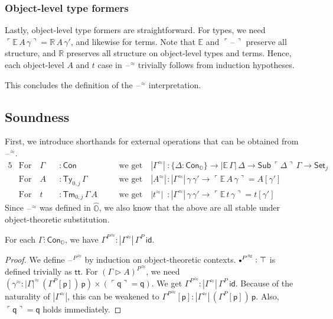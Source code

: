 \documentclass[acmsmall,review]{acmart}
\newcommand{\msf}[1]{\mathsf{#1}}
\newcommand{\mbb}[1]{\mathbb{#1}}
\newcommand{\ext}{\triangleright}
\newcommand{\mbbo}{\mbb{O}}
\newcommand{\Con}{\msf{Con}}
\newcommand{\Sub}{\msf{Sub}}
\newcommand{\Ty}{\msf{Ty}}
\newcommand{\Tm}{\msf{Tm}}
\newcommand{\Cono}{\msf{Con}_{\mbbo}}
\newcommand{\p}{\mathsf{p}}
\newcommand{\q}{\mathsf{q}}
\renewcommand{\tt}{\msf{tt}}
\newcommand{\emptycon}{\scaleobj{.75}\bullet}
\newcommand{\id}{\msf{id}}
\newcommand{\Set}{\mathsf{Set}}
\newcommand{\blank}{{\mathord{\hspace{1pt}\text{--}\hspace{1pt}}}}
\newcommand{\emb}[1]{\ulcorner#1\urcorner}
\newcommand{\hato}{\bm\hat{\mbbo}}
\newcommand{\ev}{\mbb{E}}
\newcommand{\re}{\mbb{R}}
\theoremstyle{remark}
\newcommand{\rel}{^{\approx}}
\begin{document}
\subsubsection{Object-level type formers}
Lastly, object-level type formers are straightforward. For types, we need
$\emb{\ev\,A\,\gamma} = \re\,A\,\gamma'$, and likewise for terms. Note that
$\ev$ and $\emb{\blank}$ preserve all structure, and $\re$ preserves all
structure on object-level types and terms. Hence, each object-level $A$ and $t$
case in $\blank\rel$ trivially follows from induction hypotheses.

This concludes the definition of the $\blank\rel$ interpretation.

\subsection{Soundness}

\begin{definition} First, we introduce shorthands for
external operations that can be obtained from $\blank\rel$.
\begin{alignat*}{5}
  & \text{For}\hspace{1em} \Gamma &&: \Con \hspace{1em}&&\text{we get}\hspace{1em}
         |\Gamma\rel| &&: \{\Delta : \Cono\} \to |\ev\,\Gamma|\,\Delta \to \Sub\,\emb{\Delta}\,\Gamma \to \Set_j\\
  & \text{For}\hspace{1em} A &&: \Ty_{0,j}\,\Gamma \hspace{1em}&&\text{we get}\hspace{1em} |A\rel| &&: |\Gamma\rel|\,\gamma\,\gamma' \to \emb{\ev\,A\,\gamma} = A[\gamma']\\
  & \text{For}\hspace{1em} t &&: \Tm_{0,j}\,\Gamma\,A \hspace{1em}&&\text{we get}\hspace{1em}|t\rel| &&: |\Gamma\rel|\,\gamma\,\gamma' \to \emb{\ev\,t\,\gamma} = t[\gamma']
\end{alignat*}
Since $\blank\rel$ was defined in $\hato$, we also know that the above are all
stable under object-theoretic substitution.
\end{definition}

\begin{theorem}
For each $\Gamma : \Cono$, we have ${\Gamma^P}\rel : |\Gamma\rel|\,\Gamma^P\,\id$.
\end{theorem}
\begin{proof}
We define ${\blank^P}\rel$ by induction on object-theoretic contexts.
${\emptycon^P}\rel : \top$ is defined trivially as $\tt$. For ${(\Gamma \ext
  A)^P}\rel$, we need $(\gamma\rel : |\Gamma|\rel\,(\Gamma^P[\p])\,\p) \times
(\emb{\q} = \q)$. We get ${\Gamma^P}\rel : |\Gamma\rel|\,\Gamma^P\,\id$. Because
of the naturality of $|\Gamma\rel|$, this can be weakened to ${\Gamma^P}\rel[\p]
: |\Gamma\rel|\,(\Gamma^P[\p])\,\p$. Also, $\emb{\q} = \q$ holds immediately.
\end{proof}
\end{document}
